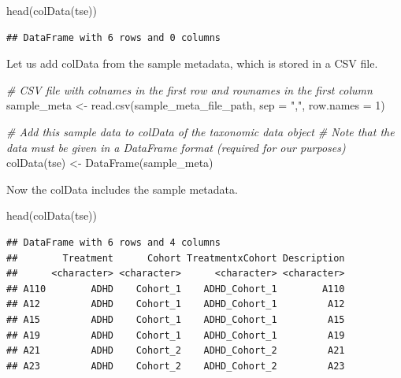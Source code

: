 \documentclass[
]{book}
\newenvironment{Shaded}{\begin{snugshade}}{\end{snugshade}}
\newcommand{\AttributeTok}[1]{\textcolor[rgb]{0.77,0.63,0.00}{#1}}
\newcommand{\CommentTok}[1]{\textcolor[rgb]{0.56,0.35,0.01}{\textit{#1}}}
\newcommand{\DecValTok}[1]{\textcolor[rgb]{0.00,0.00,0.81}{#1}}
\newcommand{\FunctionTok}[1]{\textcolor[rgb]{0.00,0.00,0.00}{#1}}
\newcommand{\NormalTok}[1]{#1}
\newcommand{\OtherTok}[1]{\textcolor[rgb]{0.56,0.35,0.01}{#1}}
\newcommand{\StringTok}[1]{\textcolor[rgb]{0.31,0.60,0.02}{#1}}
\begin{document}
\begin{Shaded}
\begin{Highlighting}[]
\FunctionTok{head}\NormalTok{(}\FunctionTok{colData}\NormalTok{(tse))}
\end{Highlighting}
\end{Shaded}

\begin{verbatim}
## DataFrame with 6 rows and 0 columns
\end{verbatim}

Let us add colData from the sample metadata, which is stored in a CSV file.

\begin{Shaded}
\begin{Highlighting}[]
\CommentTok{\# CSV file with colnames in the first row and rownames in the first column}
\NormalTok{sample\_meta }\OtherTok{\textless{}{-}} \FunctionTok{read.csv}\NormalTok{(sample\_meta\_file\_path,}
                        \AttributeTok{sep =} \StringTok{","}\NormalTok{, }\AttributeTok{row.names =} \DecValTok{1}\NormalTok{)}

\CommentTok{\# Add this sample data to colData of the taxonomic data object}
\CommentTok{\# Note that the data must be given in a DataFrame format (required for our purposes)}
\FunctionTok{colData}\NormalTok{(tse) }\OtherTok{\textless{}{-}} \FunctionTok{DataFrame}\NormalTok{(sample\_meta)}
\end{Highlighting}
\end{Shaded}

Now the colData includes the sample metadata.

\begin{Shaded}
\begin{Highlighting}[]
\FunctionTok{head}\NormalTok{(}\FunctionTok{colData}\NormalTok{(tse))}
\end{Highlighting}
\end{Shaded}

\begin{verbatim}
## DataFrame with 6 rows and 4 columns
##        Treatment      Cohort TreatmentxCohort Description
##      <character> <character>      <character> <character>
## A110        ADHD    Cohort_1    ADHD_Cohort_1        A110
## A12         ADHD    Cohort_1    ADHD_Cohort_1         A12
## A15         ADHD    Cohort_1    ADHD_Cohort_1         A15
## A19         ADHD    Cohort_1    ADHD_Cohort_1         A19
## A21         ADHD    Cohort_2    ADHD_Cohort_2         A21
## A23         ADHD    Cohort_2    ADHD_Cohort_2         A23
\end{verbatim}
\end{document}
